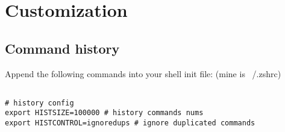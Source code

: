
\chapter{Customization}

\section{Command history}

Append the following commands into your shell init file: (mine is ~/.zshrc)


\lstset{language=Sh}
\begin{lstlisting}
  
# history config
export HISTSIZE=100000 # history commands nums
export HISTCONTROL=ignoredups # ignore duplicated commands

\end{lstlisting}